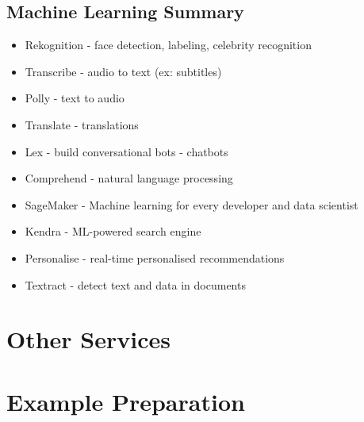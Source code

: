 \documentclass[11pt]{book}
\begin{document}
    \section{Machine Learning Summary}

    \begin{itemize}
        \item Rekognition - face detection, labeling, celebrity recognition
        \item Transcribe - audio to text (ex: subtitles)
        \item Polly - text to audio
        \item Translate - translations
        \item Lex - build conversational bots - chatbots
        \item Comprehend - natural language processing
        \item SageMaker - Machine learning for every developer and data scientist
        \item Kendra - ML-powered search engine
        \item Personalise - real-time personalised recommendations
        \item Textract - detect text and data in documents
    \end{itemize}

    \chapter{Other Services}
    \chapter{Example Preparation}
\end{document}
